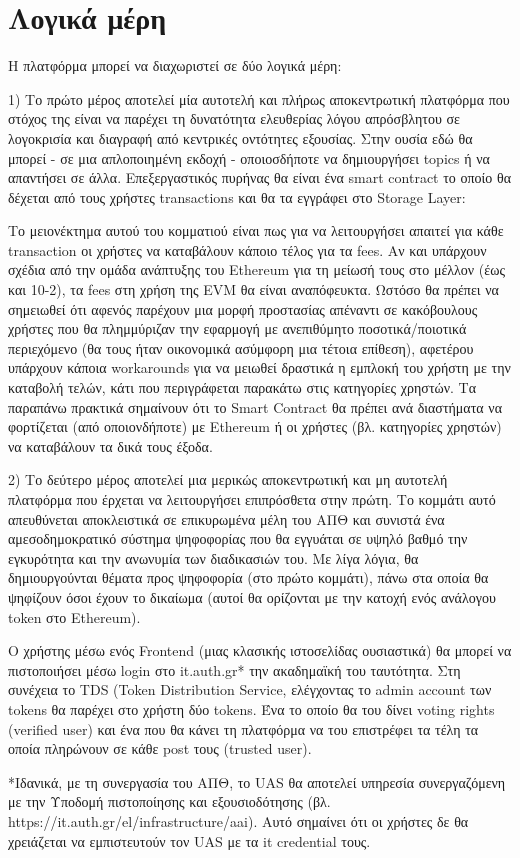 \section{Λογικά μέρη}

Η πλατφόρμα μπορεί να διαχωριστεί σε δύο λογικά μέρη:

1) Το πρώτο μέρος αποτελεί μία αυτοτελή και πλήρως αποκεντρωτική πλατφόρμα που στόχος της είναι να παρέχει τη δυνατότητα ελευθερίας λόγου απρόσβλητου σε λογοκρισία και διαγραφή από κεντρικές οντότητες εξουσίας. Στην ουσία εδώ θα μπορεί - σε μια απλοποιημένη εκδοχή - οποιοσδήποτε να δημιουργήσει topics ή να απαντήσει σε άλλα. Επεξεργαστικός πυρήνας θα είναι ένα smart contract το οποίο θα δέχεται από τους χρήστες transactions και θα τα εγγράφει στο Storage Layer:


Το μειονέκτημα αυτού του κομματιού είναι πως για να λειτουργήσει απαιτεί για κάθε transaction οι χρήστες να καταβάλουν κάποιο τέλος για τα fees. Αν και υπάρχουν σχέδια από την ομάδα ανάπτυξης του Ethereum για τη μείωσή τους στο μέλλον (έως και 10-2), τα fees στη χρήση της EVM θα είναι αναπόφευκτα. Ωστόσο θα πρέπει να σημειωθεί ότι αφενός παρέχουν μια μορφή προστασίας απέναντι σε κακόβουλους χρήστες που θα πλημμύριζαν την εφαρμογή με ανεπιθύμητο ποσοτικά/ποιοτικά περιεχόμενο (θα τους ήταν οικονομικά ασύμφορη μια τέτοια επίθεση), αφετέρου υπάρχουν κάποια workarounds για να μειωθεί δραστικά η εμπλοκή του χρήστη με την καταβολή τελών, κάτι που περιγράφεται παρακάτω στις κατηγορίες χρηστών. Τα παραπάνω πρακτικά σημαίνουν ότι το Smart Contract θα πρέπει ανά διαστήματα να φορτίζεται (από οποιονδήποτε) με Ethereum ή οι χρήστες (βλ. κατηγορίες χρηστών) να καταβάλουν τα δικά τους έξοδα.

2) Το δεύτερο μέρος αποτελεί μια μερικώς αποκεντρωτική και μη αυτοτελή πλατφόρμα που έρχεται να λειτουργήσει επιπρόσθετα στην πρώτη. Το κομμάτι αυτό απευθύνεται αποκλειστικά σε επικυρωμένα μέλη του ΑΠΘ και συνιστά ένα αμεσοδημοκρατικό σύστημα ψηφοφορίας που θα εγγυάται σε υψηλό βαθμό την εγκυρότητα και την ανωνυμία των διαδικασιών του. Με λίγα λόγια, θα δημιουργούνται θέματα προς ψηφοφορία (στο πρώτο κομμάτι), πάνω στα οποία θα ψηφίζουν όσοι έχουν το δικαίωμα (αυτοί θα ορίζονται με την κατοχή ενός ανάλογου token στο Ethereum).


O χρήστης μέσω ενός Frontend (μιας κλασικής ιστοσελίδας ουσιαστικά) θα μπορεί να πιστοποιήσει μέσω login στο it.auth.gr* την ακαδημαϊκή του ταυτότητα. Στη συνέχεια το TDS (Token Distribution Service, ελέγχοντας το admin account των tokens θα παρέχει στο χρήστη δύο tokens.  Ένα το οποίο θα του δίνει voting rights (verified user) και ένα που θα κάνει τη πλατφόρμα να του επιστρέφει τα τέλη τα οποία πληρώνουν σε κάθε post τους (trusted user).


*Ιδανικά, με τη συνεργασία του ΑΠΘ, το UAS θα αποτελεί υπηρεσία συνεργαζόμενη με την Υποδομή πιστοποίησης και εξουσιοδότησης (βλ. https://it.auth.gr/el/infrastructure/aai). Αυτό σημαίνει ότι οι χρήστες δε θα χρειάζεται να εμπιστευτούν τον UAS με τα it credential τους.
